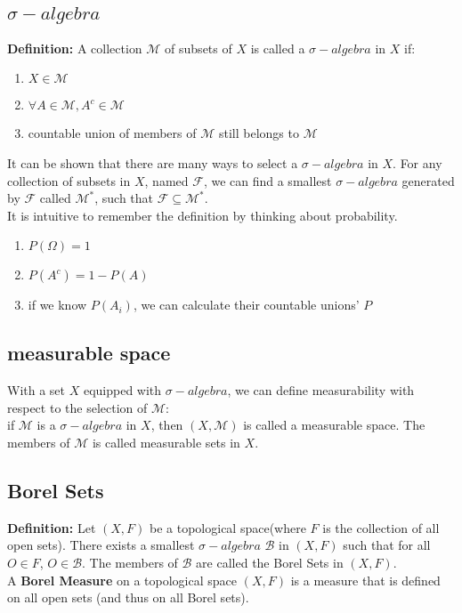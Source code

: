 \documentclass[a4paper, 12pt]{article}
\begin{document}
\subsection{$\sigma - algebra$}
\textbf{Definition: } A collection $\mathcal{M}$ of subsets of $X$ is called a $\sigma-algebra$ in $X$ if:
\begin{enumerate}
	\item $X \in \mathcal{M}$
	\item $\forall A \in \mathcal{M}, A^c \in \mathcal{M}$
	\item countable union of members of $\mathcal{M}$ still belongs to $\mathcal{M}$
\end{enumerate}
\indent It can be shown that there are many ways to select a $\sigma-algebra$ in $X$. For any collection of subsets in $X$, named $\mathcal{F}$, we can find a smallest $\sigma-algebra$ generated by $\mathcal{F}$ called $\mathcal{M^{*}}$, such that $\mathcal{F} \subseteq \mathcal{M^{*}}$.\\
\indent It is intuitive to remember the definition by thinking about probability. 
\begin{enumerate}
	\item $P(\Omega) = 1$
	\item $P(A^c) = 1 - P(A)$
	\item if we know $P(A_i)$, we can calculate their countable unions' $P$
\end{enumerate}

\subsection{measurable space}
With a set $X$ equipped with $\sigma-algebra$, we can define measurability with respect to the selection of $\mathcal{M}$: \\
\indent if $\mathcal{M}$ is a $\sigma-algebra$ in $X$, then $(X, \mathcal{M})$ is called a measurable space. The members of $\mathcal{M}$ is called measurable sets in $X$.

\subsection{Borel Sets}
\textbf{Definition: }Let $(X, F)$ be a topological space(where $F$ is the collection of all open sets). There exists a smallest $\sigma-algebra$ $\mathcal{B}$ in $(X, F)$ such that for all $O \in F$, $O \in \mathcal{B}$. The members of $\mathcal{B}$ are called the Borel Sets in $(X, F)$.\\
\indent A \textbf{Borel Measure} on a topological space $(X, F)$ is a measure that is defined on all open sets (and thus on all Borel sets).
\end{document}
